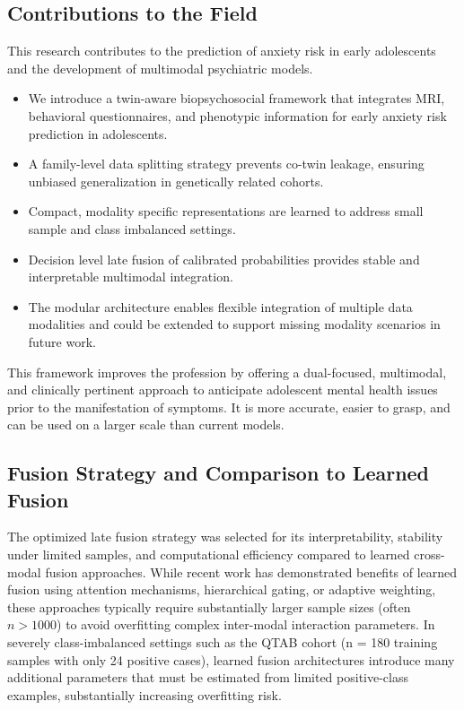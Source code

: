 \documentclass[10pt,letterpaper]{article}
\begin{document}
\subsection*{Contributions to the Field}

This research contributes to the prediction of anxiety risk in early
adolescents and the development of multimodal psychiatric models.

\begin{itemize}
    \item We introduce a twin-aware biopsychosocial framework that integrates
    MRI, behavioral questionnaires, and phenotypic information for early
    anxiety risk prediction in adolescents.
    \item A family-level data splitting strategy prevents co-twin leakage,
    ensuring unbiased generalization in genetically related cohorts.
    \item Compact, modality specific representations are learned to address
    small sample and class imbalanced settings.
    \item Decision level late fusion of calibrated probabilities provides
    stable and interpretable multimodal integration.
    \item The modular architecture enables flexible integration of multiple
    data modalities and could be extended to support missing modality
    scenarios in future work.
\end{itemize}

This framework improves the profession by offering a dual-focused, multimodal, and clinically pertinent approach to anticipate adolescent mental health issues prior to the manifestation of symptoms. It is more accurate, easier to grasp, and can be used on a larger scale than current models.

\subsection*{Fusion Strategy and Comparison to Learned Fusion}

The optimized late fusion strategy was selected for its interpretability, stability under limited samples, and computational efficiency compared to learned cross-modal fusion approaches. While recent work has demonstrated benefits of learned fusion using attention mechanisms, hierarchical gating, or adaptive weighting, these approaches typically require substantially larger sample sizes (often $n > 1000$) to avoid overfitting complex inter-modal interaction parameters. In severely class-imbalanced settings such as the QTAB cohort (n = 180 training samples with only 24 positive cases), learned fusion architectures introduce many additional parameters that must be estimated from limited positive-class examples, substantially increasing overfitting risk.
\end{document}
